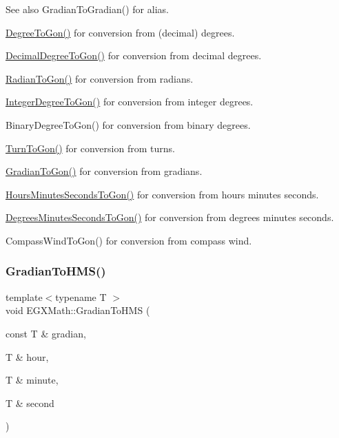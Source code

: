 \begin{DoxySeeAlso}{See also}
Gradian\+To\+Gradian() for alias. 

\mbox{\hyperlink{group___e_g_x_math-_conversions-_angle_conversions-_degree_ga87c3fab0867021e5d2501197b4db6194}{Degree\+To\+Gon()}} for conversion from (decimal) degrees. 

\mbox{\hyperlink{group___e_g_x_math-_conversions-_angle_conversions-_decimal_degree_gaeb333a1ad0aeb913c025fbd1be85fcb3}{Decimal\+Degree\+To\+Gon()}} for conversion from decimal degrees. 

\mbox{\hyperlink{group___e_g_x_math-_conversions-_angle_conversions-_radian_ga36912e5a810b64c271c4dafc17f4ca45}{Radian\+To\+Gon()}} for conversion from radians. 

\mbox{\hyperlink{group___e_g_x_math-_conversions-_angle_conversions-_integer_degree_ga6e5be425c37ad27319f09329156c64bb}{Integer\+Degree\+To\+Gon()}} for conversion from integer degrees. 

Binary\+Degree\+To\+Gon() for conversion from binary degrees. 

\mbox{\hyperlink{group___e_g_x_math-_conversions-_angle_conversions-_turn_gad81dd0bb1660ef24e28fa15b2403dec7}{Turn\+To\+Gon()}} for conversion from turns. 

\mbox{\hyperlink{group___e_g_x_math-_conversions-_angle_conversions-_gradian_gaff399262b6c8455e450e0a9dc8eb2ad1}{Gradian\+To\+Gon()}} for conversion from gradians. 

\mbox{\hyperlink{group___e_g_x_math-_conversions-_angle_conversions-_hours_minutes_seconds_ga356f1e89c3ea35a9d46967644d4ddfd3}{Hours\+Minutes\+Seconds\+To\+Gon()}} for conversion from hours minutes seconds. 

\mbox{\hyperlink{group___e_g_x_math-_conversions-_angle_conversions-_degrees_minutes_seconds_ga90b481c224ad083726ffe0fd35f4dbfc}{Degrees\+Minutes\+Seconds\+To\+Gon()}} for conversion from degrees minutes seconds. 

Compass\+Wind\+To\+Gon() for conversion from compass wind. 
\end{DoxySeeAlso}
\mbox{\label{group___e_g_x_math-_conversions-_angle_conversions-_gradian_ga6513a992679fbb97d2969cf8bd68306f}} 
\subsubsection{\texorpdfstring{Gradian\+To\+H\+M\+S()}{GradianToHMS()}}
{\footnotesize\ttfamily template$<$typename T $>$ \\
void E\+G\+X\+Math\+::\+Gradian\+To\+H\+MS (\begin{DoxyParamCaption}\item[{const T \&}]{gradian,  }\item[{T \&}]{hour,  }\item[{T \&}]{minute,  }\item[{T \&}]{second }\end{DoxyParamCaption})}



